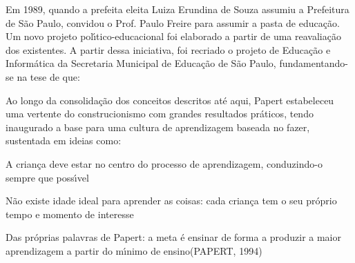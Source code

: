 \documentclass[
12pt,		%
openright,	%
twoside,  %
a4paper,			%
chapter=TITLE,		%
english,			%
french,				%
spanish,			%
brazil				%
]{USPSC-classe/USPSC}
\begin{document}
Em 1989, quando a prefeita eleita Luiza Erundina de Souza assumiu a Prefeitura de S\~ao Paulo, convidou o Prof. Paulo Freire para assumir a pasta de educa\c{c}\~ao. Um novo projeto pol\'{\i}tico-educacional foi elaborado a partir de uma reavalia\c{c}\~ao dos existentes. A partir dessa iniciativa, foi recriado o projeto de Educa\c{c}\~ao e Inform\'atica da Secretaria Municipal de Educa\c{c}\~ao de S\~ao Paulo, fundamentando-se na tese de que:











\noindent\begin{center}\mbox{\centering{}}\end{center}


Ao longo da consolida\c{c}\~ao dos conceitos descritos at\'e aqui, Papert estabeleceu uma vertente do construcionismo com grandes resultados pr\'aticos, tendo inaugurado a base para uma cultura de aprendizagem baseada no \textquotedbl fazer\textquotedbl , sustentada em ideias como:











\begin{alineas}
\item A crian\c{c}a deve estar no centro do processo de aprendizagem, conduzindo-o sempre que poss\'{\i}vel
\item N\~ao existe idade ideal para aprender as coisas: cada crian\c{c}a tem o seu pr\'oprio tempo e momento de interesse
\item Das pr\'oprias palavras de Papert: \textquotedbl a meta \'e ensinar de forma a produzir a maior aprendizagem a partir do m\'{\i}nimo de ensino\textquotedbl   (PAPERT, 1994)
\end{alineas}
\end{document}
